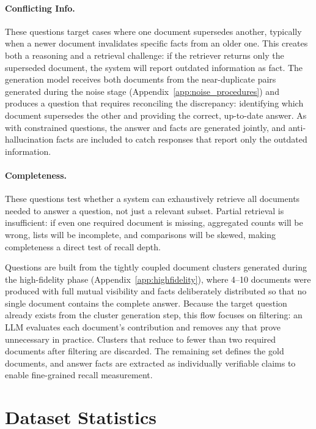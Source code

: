\documentclass{article}
\begin{document}
\paragraph{Conflicting Info.}
These questions target cases where one document supersedes another, typically when a newer document invalidates specific facts from an older one. This creates both a reasoning and a retrieval challenge: if the retriever returns only the superseded document, the system will report outdated information as fact. The generation model receives both documents from the near-duplicate pairs generated during the noise stage (Appendix~\ref{app:noise_procedures}) and produces a question that requires reconciling the discrepancy: identifying which document supersedes the other and providing the correct, up-to-date answer. As with constrained questions, the answer and facts are generated jointly, and anti-hallucination facts are included to catch responses that report only the outdated information.

\paragraph{Completeness.}
These questions test whether a system can exhaustively retrieve all documents needed to answer a question, not just a relevant subset. Partial retrieval is insufficient: if even one required document is missing, aggregated counts will be wrong, lists will be incomplete, and comparisons will be skewed, making completeness a direct test of recall depth.

Questions are built from the tightly coupled document clusters generated during the high-fidelity phase (Appendix~\ref{app:highfidelity}), where 4--10 documents were produced with full mutual visibility and facts deliberately distributed so that no single document contains the complete answer. Because the target question already exists from the cluster generation step, this flow focuses on filtering: an LLM evaluates each document's contribution and removes any that prove unnecessary in practice. Clusters that reduce to fewer than two required documents after filtering are discarded. The remaining set defines the gold documents, and answer facts are extracted as individually verifiable claims to enable fine-grained recall measurement.

\section{Dataset Statistics}
\label{app:stats}
\end{document}

